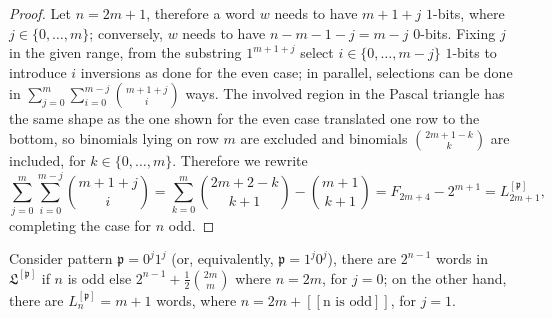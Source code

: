 \begin{proof}
Let $n=2m+1$, therefore a word $w$ needs to have $m+1+j$ $1$-bits, where $j\in
\lbrace 0,\ldots,m \rbrace$; conversely, $w$ needs to have $n-m-1-j=m-j$ $0$-bits.
Fixing $j$ in the given range, from the substring $1^{m+1+j}$ select
$i\in \lbrace 0,\ldots,m-j \rbrace$ $1$-bits  to introduce $i$ inversions as
done for the even case; in parallel, selections can be done in $
\sum_{j=0}^{m}{\sum_{i=0}^{m-j}{ {{m+1+j}\choose{i}}} } $ ways. The involved
region in the Pascal triangle has the same shape as the one shown for the even
case translated one row to the bottom, so binomials lying on row $m$ are
excluded and binomials ${ {2m+1-k}\choose{k} }$ are included, for $k\in \lbrace
0, \ldots, m \rbrace$.  Therefore we rewrite
\begin{displaymath}
    \sum_{j=0}^{m}{\sum_{i=0}^{m-j}{ {{m+1+j}\choose{i}}} }
    = \sum_{k=0}^{m}{{ {2m+2-k}\choose{k+1} }-{ {m+1}\choose{k+1} }}
    = F_{2m+4}-2^{m+1} = L_{2m+1}^{[\mathfrak{p}]},
\end{displaymath}
completing the case for $n$ odd.
\end{proof}

\begin{coro}
Consider pattern $\mathfrak{p}=0^{j}1^{j}$ (or, equivalently,
$\mathfrak{p}=1^{j}0^{j}$), there are $2^{n-1}$ words in
$\mathfrak{L}^{[\mathfrak{p}]}$ if $n$ is odd else $2^{n-1}
+\frac{1}{2}{{2m}\choose{m}}$ where $n=2m$, for $j=0$; on the other hand, there
are $L_{n}^{[\mathfrak{p}]} = m+1$ words, where $n=2m +  [\![\text{n is
odd}]\!]$, for $j=1$.
\end{coro}


